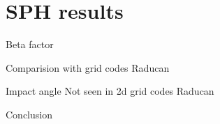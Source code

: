 \documentclass{beamer}
\begin{document}
\section{SPH results}
\begin{frame}{Beta factor}
\end{frame}
\begin{frame}{Comparision with grid codes}
	Raducan
\end{frame}

\begin{frame}{Impact angle}
	Not seen in 2d grid codes Raducan
\end{frame}
\begin{frame}{Conclusion}
\end{frame}
\end{document}
